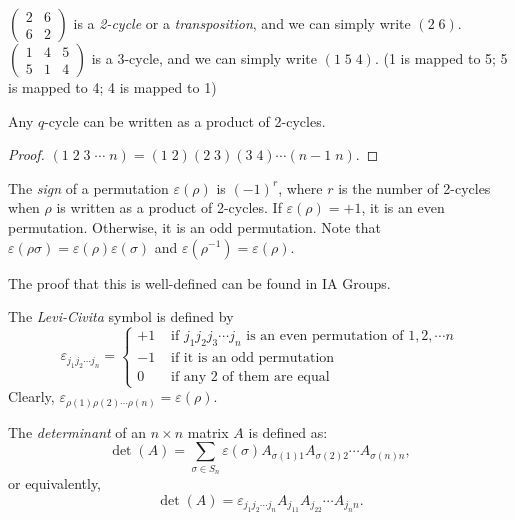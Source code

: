 \documentclass[a4paper]{article}
\begin{document}
\begin{defi}
  $\begin{pmatrix} 2 & 6 \\ 6 & 2\end{pmatrix}$ is a \emph{2-cycle} or a \emph{transposition}, and we can simply write $(2\; 6)$. $\begin{pmatrix}1 & 4 & 5\\5 & 1 & 4\end{pmatrix}$ is a 3-cycle, and we can simply write $(1\; 5\; 4)$. (1 is mapped to 5; 5 is mapped to 4; 4 is mapped to 1)
\end{defi}

\begin{prop}
  Any $q$-cycle can be written as a product of 2-cycles.
\end{prop}

\begin{proof}
  $(1\; 2\; 3\; \cdots \; n) = (1\; 2)(2\; 3)(3\; 4)\cdots (n-1\; n)$.
\end{proof}

\begin{defi}
  The \emph{sign} of a permutation $\varepsilon(\rho)$ is $(-1)^r$, where $r$ is the number of 2-cycles when $\rho$ is written as a product of 2-cycles. If $\varepsilon(\rho) = +1$, it is an even permutation. Otherwise, it is an odd permutation. Note that $\varepsilon(\rho\sigma) = \varepsilon(\rho)\varepsilon(\sigma)$ and $\varepsilon(\rho^{-1}) = \varepsilon(\rho)$.
\end{defi}
The proof that this is well-defined can be found in IA Groups.

\begin{defi}
  The \emph{Levi-Civita} symbol is defined by
  \[
    \varepsilon_{j_1j_2\cdots j_n} = \begin{cases}+1 & \text{ if } j_1j_2j_3\cdots j_n\text{ is an even permutation of }1, 2, \cdots n\\
      -1 & \text{ if it is an odd permutation}\\
      0 & \text{ if any 2 of them are equal}
    \end{cases}
  \]
  Clearly, $\varepsilon_{\rho(1)\rho(2)\cdots \rho(n)} = \varepsilon(\rho)$.
\end{defi}

\begin{defi}[Determinant]
  The \emph{determinant} of an $n\times n$ matrix $A$ is defined as:
  \[
    \det (A) = \sum_{\sigma\in S_n} \varepsilon(\sigma) A_{\sigma(1)1}A_{\sigma(2)2}\cdots A_{\sigma(n)n},
  \]
  or equivalently,
  \[
    \det(A) = \varepsilon_{j_1j_2\cdots j_n}A_{j_11}A_{j_22}\cdots A_{j_nn}.
  \]
\end{defi}
\end{document}
